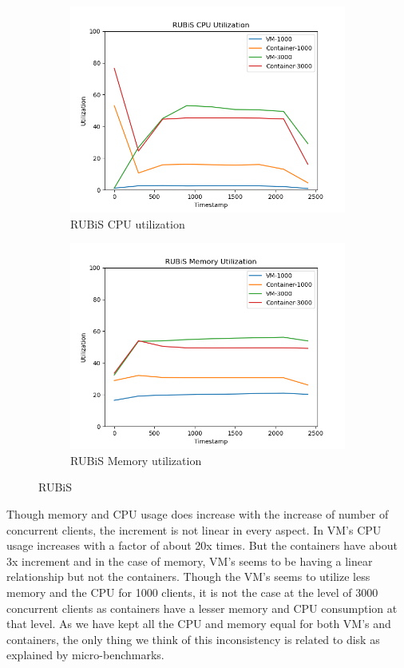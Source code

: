 \documentclass[11pt]{article}
\begin{document}
\begin{figure}[hbt!]
\centering
\begin{subfigure}{.5\textwidth}
  \centering
  \includegraphics[width=1.1\linewidth]{rubis_cpu_util.png}
  \caption{RUBiS CPU utilization}
  \label{fig:rub1}
\end{subfigure}%
\begin{subfigure}{.5\textwidth}
  \centering
  \includegraphics[width=1.1\linewidth]{rubis_mem_util.png}
  \caption{RUBiS Memory utilization}
  \label{fig:rub2}
\end{subfigure}
\caption{RUBiS}
\label{fig:rubis}
\end{figure}

Though memory and CPU usage does increase with the increase of number of concurrent clients, the increment is not linear in every aspect. In VM’s CPU usage increases with a factor of about 20x times. But the containers have about 3x increment and in the case of memory, VM's seems to be having a linear relationship but not the containers. Though the VM's seems to utilize less memory and the CPU for 1000 clients, it is not the case at the level of 3000 concurrent clients as containers have a lesser memory and CPU consumption at that level. As we have kept all the CPU and memory equal for both VM's and containers, the only thing we think of this inconsistency is related to disk as explained by micro-benchmarks.
\end{document}

